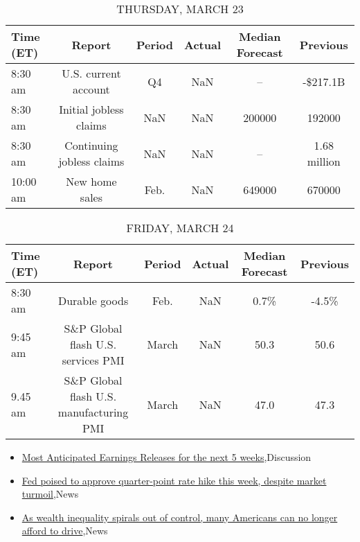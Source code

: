 \documentclass{article}%
\begin{document}
\begin{table}[htbp]%
\caption{THURSDAY, MARCH 23}%
\centering%
\begin{adjustbox}{width=1\textwidth}%
\begin{tabular}{lccccc}
\toprule
Time (ET) &                    Report & Period & Actual & Median Forecast &     Previous \\
\midrule
  8:30 am &      U.S. current account &     Q4 &    NaN &              -- &     -\$217.1B \\
  8:30 am &    Initial jobless claims &    NaN &    NaN &          200000 &       192000 \\
  8:30 am & Continuing jobless claims &    NaN &    NaN &              -- & 1.68 million \\
 10:00 am &            New home sales &   Feb. &    NaN &          649000 &       670000 \\
\bottomrule
\end{tabular}
%
\end{adjustbox}%
\end{table}

%


\begin{table}[htbp]%
\caption{FRIDAY, MARCH 24}%
\centering%
\begin{adjustbox}{width=1\textwidth}%
\begin{tabular}{lccccc}
\toprule
Time (ET) &                                  Report & Period & Actual & Median Forecast & Previous \\
\midrule
  8:30 am &                           Durable goods &   Feb. &    NaN &            0.7\% &    -4.5\% \\
  9:45 am &      S\&P Global flash U.S. services PMI &  March &    NaN &            50.3 &     50.6 \\
  9.45 am & S\&P Global flash U.S. manufacturing PMI &  March &    NaN &            47.0 &     47.3 \\
\bottomrule
\end{tabular}
%
\end{adjustbox}%
\end{table}

%
\begin{itemize}%
\item%
\href{https://reddit.com/r/StockMarket/comments/11whl60/most\_anticipated\_earnings\_releases\_for\_the\_next\_5/}{Most Anticipated Earnings Releases for the next 5 weeks},Discussion%
\item%
\href{https://reddit.com/r/Economics/comments/11wgwz8/fed\_poised\_to\_approve\_quarterpoint\_rate\_hike\_this/}{Fed poised to approve quarter-point rate hike this week, despite market turmoil},News%
\item%
\href{https://reddit.com/r/Economics/comments/11wfk7q/as\_wealth\_inequality\_spirals\_out\_of\_control\_many/}{As wealth inequality spirals out of control, many Americans can no longer afford to drive},News%
\end{itemize}%
\end{document}
